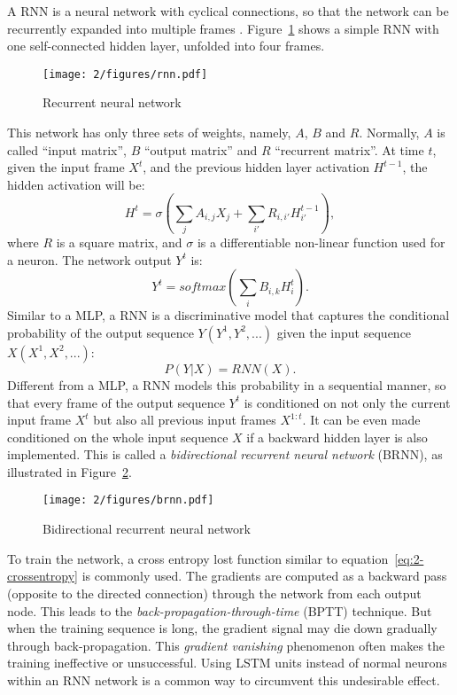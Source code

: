 A RNN is a neural network with cyclical connections, so that the network can be recurrently expanded into multiple frames \cite{elman1990finding,jordan1986attractor,lang1990time}. Figure~\ref{fig:2-rnn} shows a simple RNN with one self-connected hidden layer, unfolded into four frames.
\begin{figure}[htb]
\centering
\texttt{[image: 2/figures/rnn.pdf]}
\caption{Recurrent neural network}
\label{fig:2-rnn}
\end{figure}
This network has only three sets of weights, namely, $A$, $B$ and $R$. Normally, $A$ is called ``input matrix'', $B$ ``output matrix'' and $R$ ``recurrent matrix''. At time $t$, given the input frame $X^t$, and the previous hidden layer activation $H^{t-1}$, the hidden activation will be:
\begin{equation}
H^t = \sigma(\sum_j A_{i,j}X_j + \sum_{i'} R_{i,i'}H^{t-1}_{i'}),
\end{equation}
where $R$ is a square matrix, and $\sigma$ is a differentiable non-linear function used for a neuron. The network output $Y^t$ is:
\begin{equation}
Y^t = softmax(\sum_i B_{i,k}H^t_i).
\end{equation}
Similar to a MLP, a RNN is a discriminative model that captures the conditional probability of the output sequence $Y (Y^1,Y^2,...)$ given the input sequence $X (X^1, X^2,...)$:
\begin{equation}
P(Y|X) = RNN(X).
\end{equation}
Different from a MLP, a RNN models this probability in a sequential manner, so that every frame of the output sequence $Y^t$ is conditioned on not only the current input frame $X^t$ but also all previous input frames $X^{1:t}$. It can be even made conditioned on the whole input sequence $X$ if a backward hidden layer is also implemented. This is called a {\it bidirectional recurrent neural network} (BRNN), as illustrated in Figure~\ref{fig:2-brnn}.
\begin{figure}[htb]
\centering
\texttt{[image: 2/figures/brnn.pdf]}
\caption{Bidirectional recurrent neural network}
\label{fig:2-brnn}
\end{figure}

To train the network, a cross entropy lost function similar to equation~\ref{eq:2-crossentropy} is commonly used. The gradients are computed as a backward pass (opposite to the directed connection) through the network from each output node. This leads to the {\it back-propagation-through-time} (BPTT) \cite{rumelhart1988parallel,werbos1990backpropagation} technique. But when the training sequence is long, the gradient signal may die down gradually through back-propagation. This {\it gradient vanishing} \cite{bengio2009learning} phenomenon often makes the training ineffective or unsuccessful. Using LSTM units instead of normal neurons within an RNN network is a common way to circumvent this undesirable effect.

